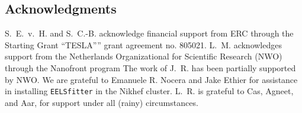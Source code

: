 \subsection*{Acknowledgments}
%
S.~E.~v.~H. and S.~C.-B. acknowledge financial support
from ERC through the Starting Grant ``TESLA”'' grant agreement
no. 805021.
%
L.~M. acknowledges support from the
Netherlands Organizational for Scientific Research (NWO)
through the Nanofront program
%
The work of J.~R. has been partially supported by NWO.
%
We are grateful to Emanuele R. Nocera and Jake Ethier for
assistance in installing {\tt EELSfitter} in the Nikhef cluster.
%
L.~R. is grateful to Cas, Agneet, and Aar, for support under all 
(rainy) circumstances.
